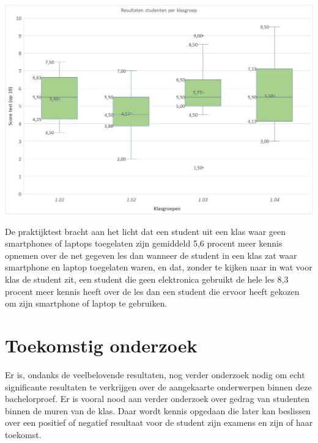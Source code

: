 \documentclass[a0,portrait]{a0poster}
\begin{document}
\begin{multicols}{2}
\begin{center}
\end{center}\vspace{1cm}

\begin{center}\vspace{1cm}
	\includegraphics[scale=0.8]{Boxplot3.jpg}
\end{center}\vspace{1cm}
De praktijktest bracht aan het licht dat een student uit een klas waar geen smartphones of
laptops toegelaten zijn gemiddeld 5,6 procent meer kennis opnemen over de net gegeven
les dan wanneer de student in een klas zat waar smartphone en laptop toegelaten waren, en
dat, zonder te kijken naar in wat voor klas de student zit, een student die geen elektronica
gebruikt de hele les 8,3 procent meer kennis heeft over de les dan een student die ervoor
heeft gekozen om zijn smartphone of laptop te gebruiken.
\color{HoGentAccent1} 
\section*{Toekomstig onderzoek}
\color{black}
Er is, ondanks de veelbelovende resultaten, nog verder onderzoek nodig om echt significante resultaten te verkrijgen over
de aangekaarte onderwerpen binnen deze bachelorproef. Er is vooral nood aan verder
onderzoek over gedrag van studenten binnen de muren van de klas. Daar wordt kennis
opgedaan die later kan beslissen over een positief of negatief resultaat voor de student zijn
examens en zijn of haar toekomst.

\end{multicols}
\end{document}
